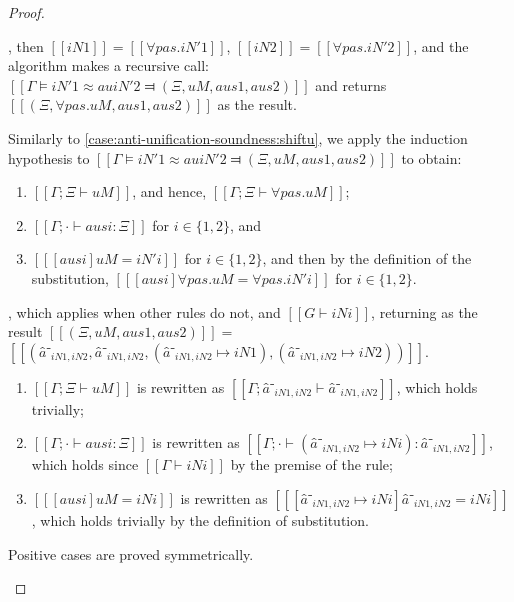 \begin{proof}
\begin{caseof}
        \item {}, then $[[iN1]] = [[∀pas.iN'1]]$,
                $[[iN2]] = [[∀pas.iN'2]]$, and the algorithm makes a recursive call:
                $[[Γ ⊨ iN'1 ≈au iN'2 ⫤ (Ξ, uM, aus1, aus2)]]$ and
                returns $[[(Ξ, ∀pas.uM, aus1, aus2)]]$ as the result.

                Similarly to \cref{case:anti-unification-soundness:shiftu}, 
                we apply the induction hypothesis to
                $[[Γ ⊨ iN'1 ≈au iN'2 ⫤ (Ξ, uM, aus1, aus2)]]$ to obtain:
                \begin{enumerate}
                    \item $[[Γ; Ξ ⊢ uM]]$, and hence, $[[Γ ; Ξ ⊢ ∀pas.uM]]$;
                    \item $[[Γ; · ⊢ ausi : Ξ]]$ for $i \in \{1,2\}$, and
                    \item $[[ [ausi] uM = iN'i ]]$ for $i \in \{1,2\}$,
                        and then by the definition of the substitution,
                        $[[ [ausi] ∀pas.uM = ∀pas.iN'i ]]$ for $i \in \{1,2\}$. 
                \end{enumerate}

        \item {}, which applies 
        when other rules do not, and $[[G ⊢ iNi]]$,
        returning as the result $[[(Ξ, uM, aus1, aus2)]] = $
        $[[({â⁻_{iN1, iN2}}, â⁻_{iN1, iN2}, (â⁻_{iN1, iN2} ↦ iN1) ,  (â⁻_{iN1, iN2} ↦ iN2))]]$.

        \begin{enumerate}
            \item $[[Γ ; Ξ ⊢ uM]]$ is rewritten as $[[Γ ; { â⁻_{iN1, iN2} } ⊢ â⁻_{iN1, iN2}]]$,
                which holds trivially;
            \item $[[Γ ; · ⊢ ausi : Ξ]]$ is rewritten as $[[Γ ; · ⊢ (â⁻_{iN1, iN2} ↦ iNi) : {â⁻_{iN1, iN2}}]]$,
                which holds since $[[Γ ⊢ iNi]]$ by the premise of the rule;
            \item $[[ [ausi] uM = iNi ]]$ is rewritten as $[[ [â⁻_{iN1, iN2} ↦ iNi] â⁻_{iN1, iN2} = iNi ]]$,
                which holds trivially by the definition of substitution.
        \end{enumerate}

        \item Positive cases are proved symmetrically.
    \end{caseof}
\end{proof}

